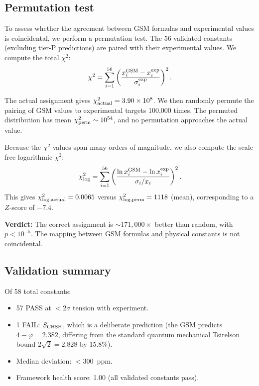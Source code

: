 \documentclass[aps,prd,twocolumn,superscriptaddress,nofootinbib,showpacs]{revtex4-2}
\begin{document}
\subsection{Permutation test}\label{sec:permtest}

To assess whether the agreement between GSM formulas and experimental
values is coincidental, we perform a permutation test.  The 56
validated constants (excluding tier-P predictions) are paired with
their experimental values.  We compute the total $\chi^2$:
\begin{equation}
\chi^2 = \sum_{i=1}^{56} \left(\frac{x_i^{\rm GSM} - x_i^{\rm exp}}{\sigma_i^{\rm exp}}\right)^2.
\end{equation}

The actual assignment gives $\chi^2_{\rm actual} = 3.90 \times 10^8$.
We then randomly permute the pairing of GSM values to experimental
targets 100{,}000 times.  The permuted distribution has mean
$\chi^2_{\rm perm} \sim 10^{54}$, and no permutation approaches the
actual value.

Because the $\chi^2$ values span many orders of magnitude, we also
compute the scale-free logarithmic $\chi^2$:
\begin{equation}
\chi^2_{\log} = \sum_{i=1}^{56}
\left(\frac{\ln x_i^{\rm GSM} - \ln x_i^{\rm exp}}{\sigma_i/x_i}\right)^2.
\end{equation}
This gives $\chi^2_{\log,\rm actual} = 0.0065$ versus
$\chi^2_{\log,\rm perm} = 1118$ (mean), corresponding to a $Z$-score
of $-7.4$.

\textbf{Verdict:} The correct assignment is ${\sim}171{,}000\times$
better than random, with $p < 10^{-5}$.  The mapping between GSM
formulas and physical constants is not coincidental.

\subsection{Validation summary}\label{sec:valsummary}

Of 58 total constants:
\begin{itemize}
\item 57 PASS at ${<}2\sigma$ tension with experiment.
\item 1 FAIL: $S_{\rm CHSH}$, which is a deliberate prediction (the
GSM predicts $4 - \varphi = 2.382$, differing from the standard
quantum mechanical Tsirelson bound $2\sqrt{2} = 2.828$ by 15.8\%).
\item Median deviation: ${<}300$~ppm.
\item Framework health score: 1.00 (all validated constants pass).
\end{itemize}
\end{document}
